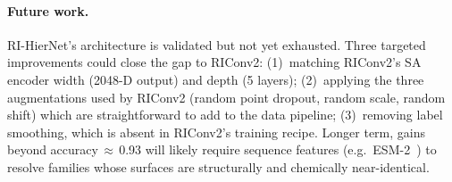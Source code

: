 \paragraph{Future work.}
RI-HierNet's architecture is validated but not yet exhausted.
Three targeted improvements could close the gap to RIConv2:
(1)~matching RIConv2's SA encoder width (2048-D output) and depth (5 layers);
(2)~applying the three augmentations used by RIConv2 (random point dropout,
random scale, random shift) which are straightforward to add to the data
pipeline;
(3)~removing label smoothing, which is absent in RIConv2's training recipe.
Longer term, gains beyond accuracy\,$\approx$\,0.93 will likely require
sequence features (e.g.\ ESM-2~\cite{esm2}) to resolve families whose
surfaces are structurally and chemically near-identical.
